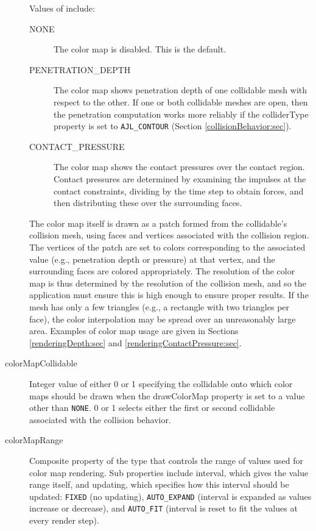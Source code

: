 \begin{description}
Values of
include:

\begin{description}

\item[NONE]\mbox{}

The color map is disabled. This is the default.

\item[PENETRATION\_DEPTH]\mbox{}

The color map shows penetration depth of one collidable mesh with
respect to the other. If one or both collidable meshes are open, then
the penetration computation works more reliably if the {\sf
colliderType} property is set to {\tt AJL\_CONTOUR} (Section
\ref{collisionBehavior:sec}).

\item[CONTACT\_PRESSURE]\mbox{}

The color map shows the contact pressures over the contact region.
Contact pressures are determined by examining the impulses at the
contact constraints, dividing by the time step to obtain forces, and
then distributing these over the surrounding faces.  

\end{description}

The color map itself is drawn as a patch formed from the collidable's
collision mesh, using faces and vertices associated with the collision
region. The vertices of the patch are set to colors corresponding to
the associated value (e.g., penetration depth or pressure) at that
vertex, and the surrounding faces are colored appropriately.  The
resolution of the color map is thus determined by the resolution of
the collision mesh, and so the application must ensure this is high
enough to ensure proper results. If the mesh has only a few triangles
(e.g., a rectangle with two triangles per face), the color
interpolation may be spread over an unreasonably large area.  Examples
of color map usage are given in Sections \ref{renderingDepth:sec} and
\ref{renderingContactPressure:sec}.

\item[colorMapCollidable]

Integer value of either 0 or 1 specifying the collidable onto which color
maps should be drawn when the {\sf drawColorMap} property is set to a
value other than {\tt NONE}. 0 or 1 selects either the first or second
collidable associated with the collision behavior.

\item[colorMapRange]\mbox{}

Composite property of the type
 that controls the range
of values used for color map rendering. Sub properties include {\sf
interval}, which gives the value range itself, and {\sf updating},
which specifies how this interval should be updated: {\tt FIXED} (no
updating), {\tt AUTO\_EXPAND} (interval is expanded as values increase
or decrease), and {\tt AUTO\_FIT} (interval is reset to fit the values
at every render step).

\end{description}

